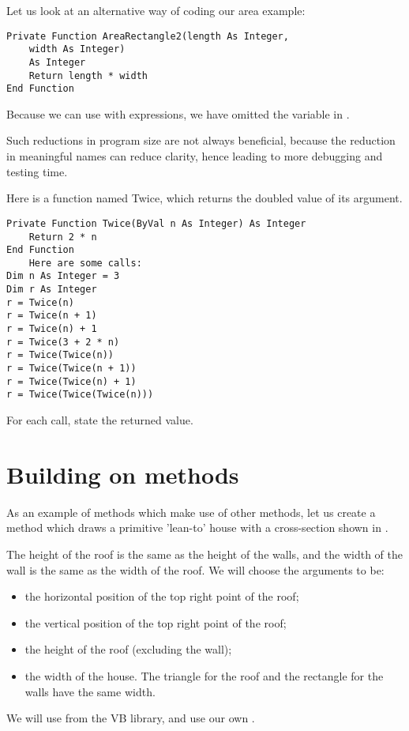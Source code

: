 		Let us look at an alternative way of coding our area example:
		\begin{lstlisting}
Private Function AreaRectangle2(length As Integer,
	width As Integer)
	As Integer
	Return length * width
End Function
		\end{lstlisting}
		Because we can use  with expressions, we have omitted the variable  in .

		Such reductions in program size are not always beneficial, because the reduction in meaningful names can reduce clarity, hence leading to more debugging and testing time.

		\begin{stqb}
			\begin{STQ}
				\item	Here is a function named Twice, which returns the doubled value of its  argument.
					\begin{lstlisting}
Private Function Twice(ByVal n As Integer) As Integer
	Return 2 * n
End Function
	Here are some calls:
Dim n As Integer = 3
Dim r As Integer
r = Twice(n)
r = Twice(n + 1)
r = Twice(n) + 1
r = Twice(3 + 2 * n)
r = Twice(Twice(n))
r = Twice(Twice(n + 1))
r = Twice(Twice(n) + 1)
r = Twice(Twice(Twice(n)))
					\end{lstlisting}
					For each call, state the returned value.
			\end{STQ}
		\end{stqb}

		
	\section{Building on methods}
	As an example of methods which make use of other methods, let us create a method which draws a primitive 'lean-to' house with a cross-section shown in . 
		
		The height of the roof is the same as the height of the walls, and the width of the wall is the same as the width of the roof. We will choose the  arguments 
to be:
		\begin{itemize}
			\item the horizontal position of the top right point of the roof;
			\item the vertical position of the top right point of the roof;
			\item the height of the roof (excluding the wall);
			\item the width of the house. The triangle for the roof and the rectangle for the walls have the same width.
		\end{itemize}
		We will use  from the VB library, and use our own .

